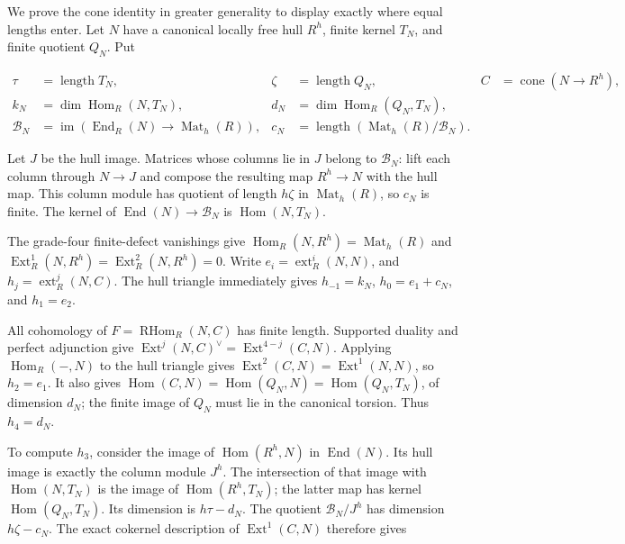 We prove the cone identity in greater generality to display
exactly where equal lengths enter. Let \(N\) have a canonical
locally free hull \(R^h\), finite kernel \(T_N\), and finite quotient \(Q_N\).
Put

\[
 \begin{split}
 \tau&=\operatorname{length}T_N,&
 \zeta&=\operatorname{length}Q_N,&
 C&=\operatorname{cone}(N\longrightarrow R^h),\\
 k_N&=\dim\operatorname{Hom}_R(N,T_N),&
 d_N&=\dim\operatorname{Hom}_R(Q_N,T_N),\\
 \mathcal B_N&=\operatorname{im}(\operatorname{End}_R(N)
                         \longrightarrow\operatorname{Mat}_h(R)),&
 c_N&=\operatorname{length}(\operatorname{Mat}_h(R)/\mathcal B_N).
 \end{split}
 \tag{NI.15}
\]

Let \(J\) be the hull image. Matrices whose columns lie in \(J\) belong
to \(\mathcal B_N\): lift each column through \(N\to J\) and compose the resulting
map \(R^h\to N\) with the hull map. This column module has quotient
of length \(h\zeta\) in \(\operatorname{Mat}_h(R)\), so \(c_N\) is finite. The kernel of
\(\operatorname{End}(N)\to \mathcal B_N\) is \(\operatorname{Hom}(N,T_N)\).

The grade-four finite-defect vanishings give
\(\operatorname{Hom}_R(N,R^h)=\operatorname{Mat}_h(R)\) and
\(\operatorname{Ext}^1_R(N,R^h)=\operatorname{Ext}^2_R(N,R^h)=0\). Write
\(e_i=\operatorname{ext}^i_R(N,N)\), and \(h_j=\operatorname{ext}^j_R(N,C)\).
The hull triangle immediately gives
\(h_{-1}=k_N\), \(h_0=e_1+c_N\), and \(h_1=e_2\).

All cohomology of \(F=\operatorname{RHom}_R(N,C)\) has finite length. Supported
duality and perfect adjunction give
\(\operatorname{Ext}^j(N,C)^\vee=\operatorname{Ext}^{4-j}(C,N)\). Applying \(\operatorname{Hom}_R(-,N)\) to the
hull triangle gives \(\operatorname{Ext}^2(C,N)=\operatorname{Ext}^1(N,N)\), so \(h_2=e_1\).
It also gives \(\operatorname{Hom}(C,N)=\operatorname{Hom}(Q_N,N)=\operatorname{Hom}(Q_N,T_N)\), of dimension
\(d_N\); the finite image of \(Q_N\) must lie in the canonical torsion.
Thus \(h_4=d_N\).

To compute \(h_3\), consider the image of \(\operatorname{Hom}(R^h,N)\) in \(\operatorname{End}(N)\).
Its hull image is exactly the column module \(J^h\). The intersection
of that image with \(\operatorname{Hom}(N,T_N)\) is the image of \(\operatorname{Hom}(R^h,T_N)\);
the latter map has kernel \(\operatorname{Hom}(Q_N,T_N)\). Its dimension is
\(h\tau-d_N\). The quotient \(\mathcal B_N/J^h\) has dimension \(h\zeta-c_N\).
The exact cokernel description of \(\operatorname{Ext}^1(C,N)\) therefore gives

